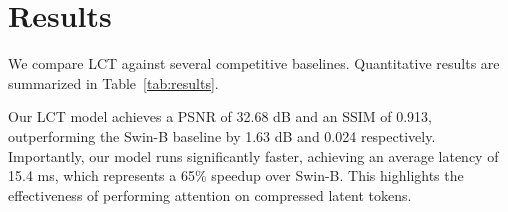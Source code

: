 \section{Results}
We compare LCT against several competitive baselines. Quantitative results are summarized in Table~\ref{tab:results}.

\begin{table}[t]
    \centering
    \caption{Quantitative comparison of image reconstruction quality and inference latency on the fictional Synapse-Cityscapes-HD and Nexa-10M validation sets. Best results are shown in \textbf{bold}.}
    \label{tab:results}
    \vspace{8pt}
\end{table}

Our LCT model achieves a PSNR of 32.68 dB and an SSIM of 0.913, outperforming the Swin-B baseline by 1.63 dB and 0.024 respectively. Importantly, our model runs significantly faster, achieving an average latency of 15.4 ms, which represents a 65\% speedup over Swin-B. This highlights the effectiveness of performing attention on compressed latent tokens.
